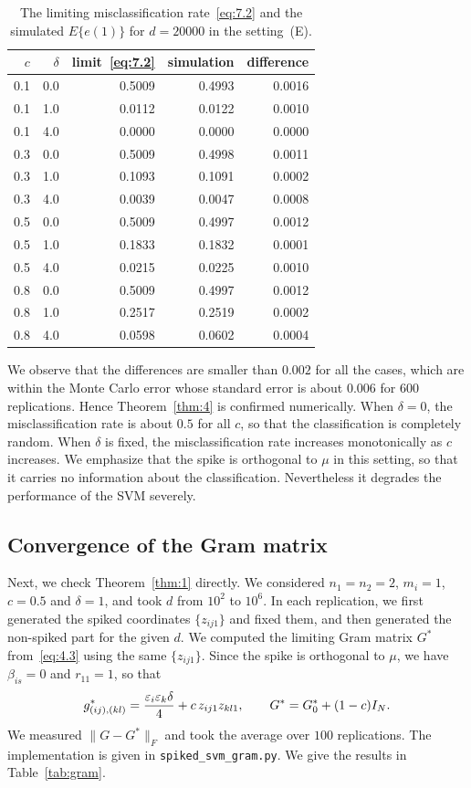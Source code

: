\begin{table}[ht]
\centering
\caption{The limiting misclassification rate~\eqref{eq:7.2} and the simulated
$E\{e(1)\}$ for $d=20000$ in the setting~(E).}
\label{tab:2}
\begin{tabular}{@{}rrrrr@{}}
\toprule
$c$ & $\delta$ & limit~\eqref{eq:7.2} & simulation & difference \\
\midrule
0.1 & 0.0 & 0.5009 & 0.4993 & 0.0016 \\
0.1 & 1.0 & 0.0112 & 0.0122 & 0.0010 \\
0.1 & 4.0 & 0.0000 & 0.0000 & 0.0000 \\
0.3 & 0.0 & 0.5009 & 0.4998 & 0.0011 \\
0.3 & 1.0 & 0.1093 & 0.1091 & 0.0002 \\
0.3 & 4.0 & 0.0039 & 0.0047 & 0.0008 \\
0.5 & 0.0 & 0.5009 & 0.4997 & 0.0012 \\
0.5 & 1.0 & 0.1833 & 0.1832 & 0.0001 \\
0.5 & 4.0 & 0.0215 & 0.0225 & 0.0010 \\
0.8 & 0.0 & 0.5009 & 0.4997 & 0.0012 \\
0.8 & 1.0 & 0.2517 & 0.2519 & 0.0002 \\
0.8 & 4.0 & 0.0598 & 0.0602 & 0.0004 \\
\bottomrule
\end{tabular}
\end{table}

We observe that the differences are smaller than $0.002$ for all the cases, which
are within the Monte Carlo error whose standard error is about $0.006$ for $600$
replications. Hence Theorem~\ref{thm:4} is confirmed numerically. When
$\delta=0$, the misclassification rate is about $0.5$ for all $c$, so that the
classification is completely random. When $\delta$ is fixed, the misclassification
rate increases monotonically as $c$ increases. We emphasize that the spike is
orthogonal to $\mu$ in this setting, so that it carries no information about the
classification. Nevertheless it degrades the performance of the SVM severely.

\subsection{Convergence of the Gram matrix}
\label{sec:sim-gram}

Next, we check Theorem~\ref{thm:1} directly. We considered $n_1=n_2=2$, $m_i=1$,
$c=0.5$ and $\delta=1$, and took $d$ from $10^2$ to $10^6$. In each replication,
we first generated the spiked coordinates $\{z_{ij1}\}$ and fixed them, and then
generated the non-spiked part for the given $d$. We computed the limiting Gram
matrix $G^*$ from~\eqref{eq:4.3} using the same $\{z_{ij1}\}$. Since the spike is
orthogonal to $\mu$, we have $\beta_{is}=0$ and $r_{11}=1$, so that
\[
g^*_{(ij),(kl)}
=\frac{\varepsilon_i\varepsilon_k\delta}{4}+c\,z_{ij1}z_{kl1},
\qquad
G^*=G_0^*+(1-c)I_N.
\]
We measured $\|G-G^*\|_F$ and took the average over $100$ replications. The
implementation is given in \texttt{spiked\_svm\_gram.py}. We give
the results in Table~\ref{tab:gram}.

